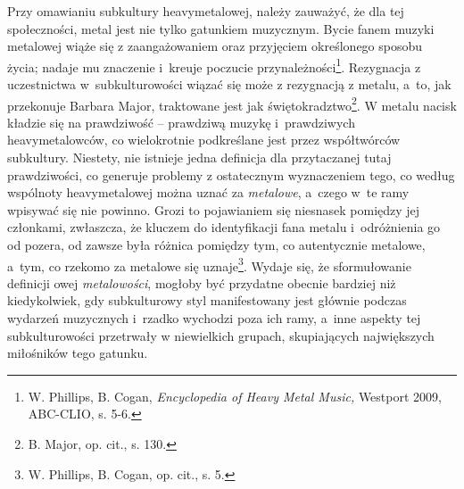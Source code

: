 \documentclass[12pt, a4paper, titlepage]{report}
\begin{document}
Przy omawianiu subkultury heavymetalowej, należy zauważyć, że dla tej społeczności, metal jest nie tylko gatunkiem muzycznym. Bycie fanem muzyki metalowej wiąże się z zaangażowaniem oraz przyjęciem określonego sposobu życia; nadaje mu znaczenie i~kreuje poczucie przynależności\footnote{W. Phillips, B. Cogan, \textit{Encyclopedia of Heavy Metal Music,} Westport 2009, ABC-CLIO, s. 5-6.}. Rezygnacja z uczestnictwa w~subkulturowości wiązać się może z rezygnacją z metalu, a~to, jak przekonuje Barbara Major, traktowane jest jak świętokradztwo\footnote{B. Major, op. cit., s. 130.}. W metalu nacisk kładzie się na prawdziwość -- prawdziwą muzykę i~prawdziwych heavymetalowców, co wielokrotnie podkreślane jest przez współtwórców subkultury. Niestety, nie istnieje jedna definicja dla przytaczanej tutaj prawdziwości, co generuje problemy z ostatecznym wyznaczeniem tego, co według wspólnoty heavymetalowej można uznać za \emph{metalowe}, a~czego w~te ramy wpisywać się nie powinno. Grozi to pojawianiem się niesnasek pomiędzy jej członkami, zwłaszcza, że kluczem do identyfikacji fana metalu i~odróżnienia go od pozera, od zawsze była różnica pomiędzy tym, co autentycznie metalowe, a~tym, co rzekomo za metalowe się uznaje\footnote{W. Phillips, B. Cogan, op. cit., s. 5.}. Wydaje się, że sformułowanie definicji owej \emph{metalowości}, mogłoby być przydatne obecnie bardziej niż kiedykolwiek, gdy subkulturowy styl manifestowany jest głównie podczas wydarzeń muzycznych i~rzadko wychodzi poza ich ramy, a~inne aspekty tej subkulturowości przetrwały w niewielkich grupach, skupiających największych miłośników tego gatunku. 
\end{document}
